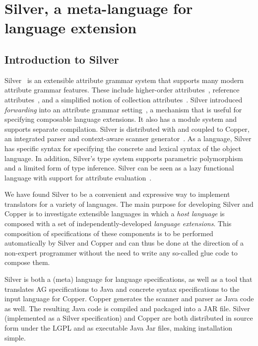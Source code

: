 
\newcommand{\code}[1]{\texttt{#1}}

\section{Silver, a meta-language for language extension}

\subsection{Introduction to Silver}

Silver~\cite{vanwyk10scp} is an extensible attribute grammar system
that supports many modern attribute grammar features.  These include
higher-order attributes~\cite{vogt89}, reference
attributes~\cite{hedin00informatica}, and a simplified notion of
collection attributes~\cite{boyland05}.
%
Silver introduced \emph{forwarding} into an attribute grammar
setting~\cite{vanwyk02}, a mechanism that is useful for specifying
composable language extensions.
%
It also has a module system and supports separate compilation.
%
Silver is distributed with and coupled to Copper, an integrated parser
and context-aware scanner generator~\cite{vanwyk07gpce}.  As a
language, Silver has specific syntax for specifying the concrete and
lexical syntax of the object language.
%
In addition, Silver's type system supports parametric polymorphism and
a limited form of type inference.  Silver can be seen as a lazy
functional language with support for attribute evaluation~\cite{kaminski11sle}.



We have found Silver to be a convenient and expressive way to implement
translators for a variety of languages.  The main purpose for
developing Silver and Copper is to investigate extensible languages in
which a \emph{host language} is composed with a set of
independently-developed \emph{language extensions}.  This composition
of specifications of these components is to be performed automatically
by Silver and Copper and can thus be done at the direction of a
non-expert programmer without the need to write any so-called glue
code to compose them.

Silver is both a (meta) language for language specifications, as well
as a tool that translates AG specifications to Java and concrete
syntax specifications to the input language for Copper.  Copper
generates the scanner and parser as Java code as well.  The resulting
Java code is compiled and packaged into a JAR file.  Silver
(implemented as a Silver specification) and Copper are both
distributed in source form under the LGPL and as executable
Java Jar files, making installation simple.


